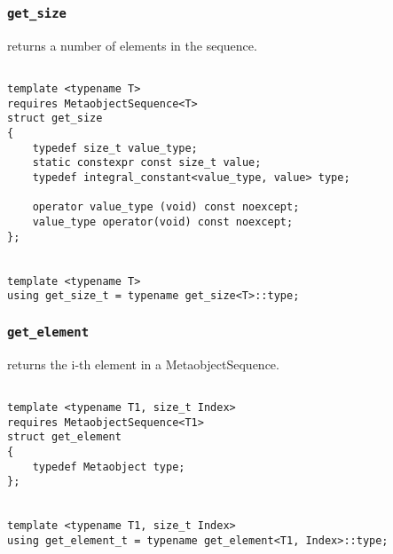 
\subsubsection{\texttt{get\_size}}

returns a number of elements in the sequence.

\begin{verbatim}

template <typename T>
requires MetaobjectSequence<T>
struct get_size
{
	typedef size_t value_type;
	static constexpr const size_t value;
	typedef integral_constant<value_type, value> type;

	operator value_type (void) const noexcept;
	value_type operator(void) const noexcept;
};


template <typename T>
using get_size_t = typename get_size<T>::type;

\end{verbatim}

\subsubsection{\texttt{get\_element}}

returns the i-th element in a MetaobjectSequence.

\begin{verbatim}

template <typename T1, size_t Index>
requires MetaobjectSequence<T1>
struct get_element
{
	typedef Metaobject type;
};


template <typename T1, size_t Index>
using get_element_t = typename get_element<T1, Index>::type;

\end{verbatim}
